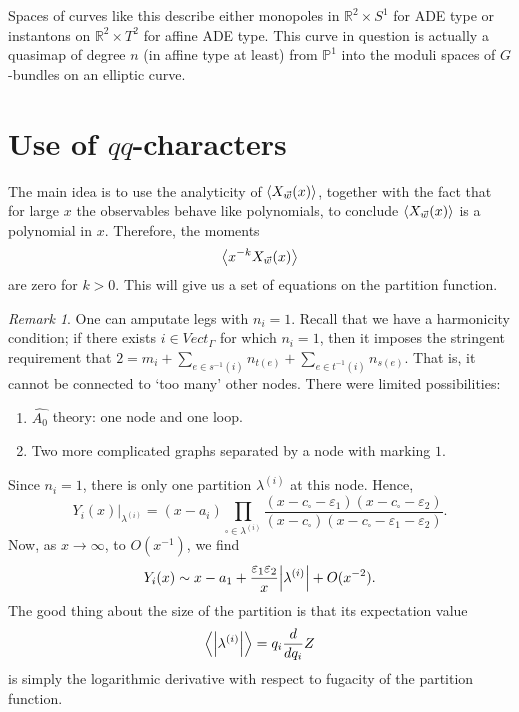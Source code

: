 \documentclass[leqno, openany]{memoir}
\theoremstyle{definition}
\theoremstyle{remark}
\newtheorem{rmk}[thm]{Remark}
\theoremstyle{plain}
\theoremstyle{definition}
\theoremstyle{remark}
\newcommand{\ep}{\varepsilon}
\begin{document}
Spaces of curves like this describe either monopoles in $\mathbb{R}^2 \times S^1$ for ADE type or instantons on $\mathbb{R}^2 \times T^2$ for affine ADE type. This curve in question is actually a quasimap of degree $n$ (in affine type at least) from $\mathbb{P}^1$ into the moduli spaces of $G$-bundles on an elliptic curve.

\section{Use of $qq$-characters}

The main idea is to use the analyticity of $\ev{X_{\vec{w}}(x)}$, together with the fact that for large $x$ the observables 
behave like polynomials, to conclude $\ev{X_{\vec{w}}(x)}$ is a polynomial in $x$.
Therefore, the moments 
\[
\ev{ x^{-k} X_{\vec{w}}(x)}
\]
are zero for $k > 0$. This will give us a set of equations on the partition function. 

\begin{rmk}
One can amputate legs with $n_i = 1$. 
Recall that we have a harmonicity condition; if there exists $i \in Vect_{\Gamma}$ for which $n_i = 1$, then it imposes the 
stringent requirement that $2 = m_i + \sum_{e \in s^{-1}(i)} n_{t(e)} + \sum_{e \in t^{-1}(i)} n_{s(e)}$. That is, it cannot be connected to 
`too many' other nodes. 
There were limited possibilities: 
\begin{enumerate}
\item $\widehat{A_0}$ theory: one node and one loop. 
\item Two more complicated graphs separated  by a node with marking $1$. 
\end{enumerate}
Since $n_i =1$, there is only one partition $\lambda^{(i)}$ at this node. Hence,  
\[
Y_i(x)|_{\lambda^{(i)}} = (x-a_i) \prod_{\square \in \lambda^{(i)}} \frac{(x - c_\square - \ep_1)(x - c_\square - \ep_2)}{(x - c_\square) (x - c_\square - \ep_1 - \ep_2)} .
\]
Now, as $x \to \infty$, to $O(x^{-1})$, we find 
\[
Y_i(x) \sim x - a_1 + \frac{\ep_1 \ep_2}{x} \abs{\lambda^{(i)}} + O(x^{-2}).
\]
The good thing about the size of the partition is that its expectation value
\[
    \ev{\abs{\lambda^{(i)}}} = q_i \frac{d}{dq_i} Z
\]
is simply the logarithmic derivative with respect to fugacity of the partition function.
\end{rmk}
\end{document}
